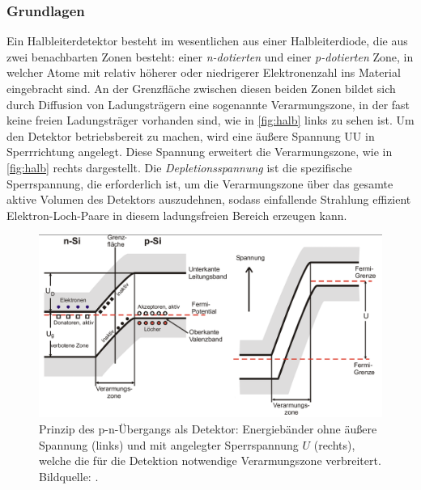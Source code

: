 \subsubsection{Grundlagen}
Ein Halbleiterdetektor besteht im wesentlichen aus einer Halbleiterdiode, die aus zwei benachbarten Zonen besteht: einer \textit{n-dotierten} und einer \textit{p-dotierten} Zone, in welcher Atome mit relativ höherer oder niedrigerer Elektronenzahl ins Material eingebracht sind. 
An der Grenzfläche zwischen diesen beiden Zonen bildet sich durch Diffusion von Ladungsträgern eine sogenannte Verarmungszone, in der fast keine freien Ladungsträger vorhanden sind, wie in \autoref{fig:halb} links zu sehen ist. Um den Detektor betriebsbereit zu machen, wird eine äußere Spannung UU in Sperrrichtung angelegt. Diese Spannung erweitert die Verarmungszone, wie in \autoref{fig:halb} rechts dargestellt. Die \textit{Depletionsspannung} ist die spezifische Sperrspannung, die erforderlich ist, um die Verarmungszone über das gesamte aktive Volumen des Detektors auszudehnen, sodass einfallende Strahlung effizient Elektron-Loch-Paare in diesem ladungsfreien Bereich erzeugen kann.
\begin{figure}[H]
  \centering
  \includegraphics[scale=0.3]{Ressourcen/halbleiter.png}
  \caption{Prinzip des p-n-Übergangs als Detektor: Energiebänder ohne äußere Spannung (links) und mit angelegter Sperrspannung \(U\) (rechts), welche die für die Detektion notwendige Verarmungszone verbreitert. Bildquelle: \cite{anleitung}.}
  \label{fig:halb}
\end{figure}

